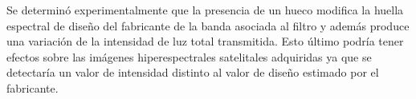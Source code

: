Se determinó experimentalmente que la presencia de un hueco modifica la huella espectral de diseño del fabricante de la banda asociada al filtro y además produce una variación de la intensidad de luz total transmitida. Esto último podría tener efectos sobre las imágenes hiperespectrales satelitales adquiridas ya que se detectaría un valor de intensidad distinto al valor de diseño estimado por el fabricante.